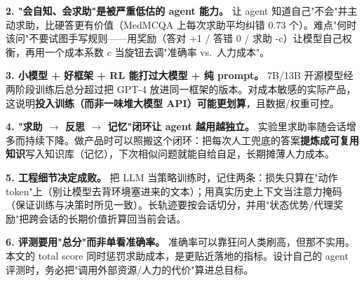 \documentclass[11pt,UTF8,fontset=fandol]{ctexart}
\begin{document}
\begin{takeaway}
\textbf{2. "会自知、会求助"是被严重低估的 agent 能力。} 让 agent 知道自己"不会"并主动求助，比硬答更有价值（MedMCQA 上每次求助平均纠错 0.73 个）。难点"何时该问"不要试图手写规则——用奖励（答对 +1 / 答错 0 / 求助 -c）让模型自己权衡，再用一个成本系数 $c$ 当旋钮去调"准确率 vs.\ 人力成本"。
\end{takeaway}

\begin{takeaway}
\textbf{3. 小模型 + 好框架 + RL 能打过大模型 + 纯 prompt。} 7B/13B 开源模型经两阶段训练后总分超过把 GPT-4 放进同一框架的版本。对成本敏感的实际产品，这说明\textbf{投入训练（而非一味堆大模型 API）可能更划算}，且数据/权重可控。
\end{takeaway}

\begin{takeaway}
\textbf{4. "求助 $\to$ 反思 $\to$ 记忆"闭环让 agent 越用越独立。} 实验里求助率随会话增多而持续下降。做产品时可以照搬这个闭环：把每次人工兜底的答案\textbf{提炼成可复用知识}写入知识库（记忆），下次相似问题就能自给自足，长期摊薄人力成本。
\end{takeaway}

\begin{takeaway}
\textbf{5. 工程细节决定成败。} 把 LLM 当策略训练时，记住两条：损失只算在"动作 token"上（别让模型去背环境塞进来的文本）；用真实历史上下文当注意力掩码（保证训练与决策时所见一致）。长轨迹要按会话切分，并用"状态优势/代理奖励"把跨会话的长期价值折算回当前会话。
\end{takeaway}

\begin{takeaway}
\textbf{6. 评测要用"总分"而非单看准确率。} 准确率可以靠狂问人类刷高，但那不实用。本文的 total score 同时惩罚求助成本，是更贴近落地的指标。设计自己的 agent 评测时，务必把"调用外部资源/人力的代价"算进总目标。
\end{takeaway}

\vspace{0.5em}

\end{document}
